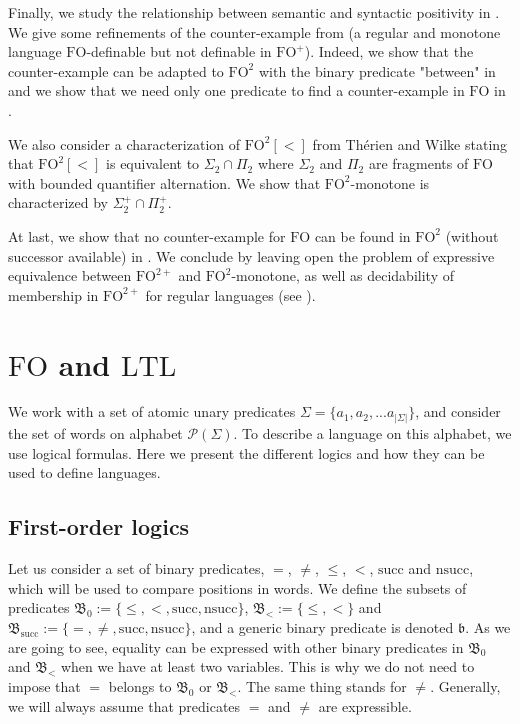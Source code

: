 \documentclass[a4paper,UKenglish,cleveref, autoref, thm-restate]{lipics-v2021}
\renewcommand{\alph}{\part(\Sigma)}
\newcommand{\FO}{\mathrm{FO}}
\newcommand{\FOp}{\FO^+}
\newcommand{\FOtw}{\FO^2}
\newcommand{\FOtwp}{\FO^{2+}}
\newcommand{\LTL}{\mathrm{LTL}}
\renewcommand{\part}{\mathcal{P}}
\renewcommand{\succ}{\mathrm{succ}}
\renewcommand{\nsucc}{\mathrm{nsucc}}
\newcommand{\bin}{\mathfrak{B}}
\renewcommand{\b}{\mathfrak{b}}
\begin{document}
Finally, we study the relationship between semantic and syntactic positivity in .
We give some refinements of the counter-example from \cite{PFO} (a regular and monotone language $\FO$-definable but not definable in $\FOp$).
Indeed, we show that the counter-example can be adapted to $\FOtw$ with the binary predicate "between" in  and we show that we need only one predicate to find a counter-example in $\FO$ in .

We also consider a characterization of $\FOtw[<]$ from Thérien and Wilke \cite{OneQuantifierAlternation} stating that $\FOtw[<]$ is equivalent to $\Sigma_2 \cap \Pi_2$ where $\Sigma_2$ and $\Pi_2$ are fragments of $\FO$ with bounded quantifier alternation.
We show that $\FOtw$-monotone is characterized by $\Sigma_2^+ \cap \Pi_2^+$.

At last, we show that no counter-example for $\FO$ can be found in $\FOtw$ (without successor available) in .
We conclude by leaving open the problem of expressive equivalence between $\FOtwp$ and $\FOtw$-monotone, as well as decidability of membership in $\FOtwp$ for regular languages (see ).






\section{\texorpdfstring{$\FO$ and $\LTL$}{FO and LTL}} \label{sec:FOandLTL}





We work with a set of atomic unary predicates $\Sigma = \{a_1,a_2,...a_{|\Sigma|}\}$, and consider the set of words on alphabet $\alph$.
To describe a language on this alphabet, we use logical formulas. Here we present the different logics and how they can be used to define languages.





\subsection{First-order logics} \label{sec:FO}


Let us consider a set of binary predicates, $=$, $\neq$, $\leq$, $<$, $\succ$ and $\nsucc$, which will be used to compare positions in words. We define the subsets of predicates $\bin_0 := \{ \leq,<, \succ, \nsucc\}$, $\bin_< := \{\leq,<\}$ and $\bin_{\succ} := \{=, \neq, \succ, \nsucc\}$, and a generic binary predicate is denoted $\b$.
As we are going to see, equality can be expressed with other binary predicates in $\bin_0$ and $\bin_<$ when we have at least two variables.
This is why we do not need to impose that $=$ belongs to $\bin_0$ or $\bin_<$.
The same thing stands for $\neq$. Generally, we will always assume that predicates $=$ and $\neq$ are expressible.
\end{document}
